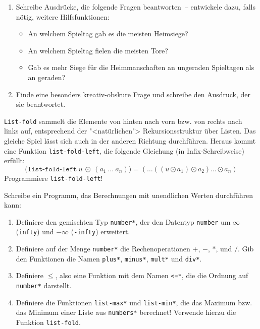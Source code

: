 \begin{aufgabe}
\begin{enumerate}
  \item Schreibe Ausdrücke, die folgende Fragen beantworten~--
  entwickele dazu, falls nötig, weitere Hilfsfunktionen:
  \begin{itemize}
    \item An welchem Spieltag gab es die meisten Heimsiege?
    \item An welchem Spieltag fielen die meisten Tore?
    \item Gab es mehr Siege für die Heimmanschaften an ungeraden Spieltagen als an
      geraden?
    \end{itemize}
    
  \item Finde eine besonders
    kreativ-obskure Frage und schreibe den Ausdruck, der sie
    beantwortet.
\end{enumerate} 

\end{aufgabe}

\begin{aufgabe}
  \texttt{List-fold} sammelt die Elemente von hinten nach vorn bzw.
  von rechts nach links auf, entsprechend der "<natürlichen">
  Rekursionsstruktur über Listen.  Das gleiche Spiel lässt sich auch in
  der anderen Richtung durchführen.  Heraus kommt eine Funktion
  \texttt{list-fold-left}, die folgende Gleichung (in
  Infix-Schreibweise) erfüllt:
  \begin{displaymath}
    \texttt{(list-fold-left}~u~\odot~(a_1~\ldots~a_n)\texttt{)}
    = (\ldots((u\odot a_1)\odot a_2)\ldots\odot a_n)
  \end{displaymath}
  Programmiere \texttt{list-fold-left}!
\end{aufgabe}


\begin{aufgabe}
  Schreibe ein Programm, das Berechnungen
  mit unendlichen Werten durchführen kann:
  
  \begin{enumerate}
  \item Definiere den gemischten Typ \texttt{number*}, der den
    Datentyp \texttt{number} um $\infty$ (\texttt{infty}) und $- \infty$
    (\texttt{-infty}) erweitert.
  \item Definiere auf der Menge \texttt{number*} die
    Rechenoperationen $+$, $-$, $*$, und $/$.  Gib den Funktionen
    die Namen \texttt{plus*}, \texttt{minus*}, \texttt{mult*} und
    \texttt{div*}.
  \item Definiere $\leq$, also eine Funktion mit dem
    Namen \texttt{<=*}, die die Ordnung auf \texttt{number*} darstellt.
  \item Definiere die Funktionen \texttt{list-max*} und
    \texttt{list-min*}, die das Maximum bzw. das Minimum einer Liste 
    aus \texttt{numbers*} berechnet!  Verwende hierzu die Funktion \texttt{list-fold}.
  \end{enumerate}
\end{aufgabe}

